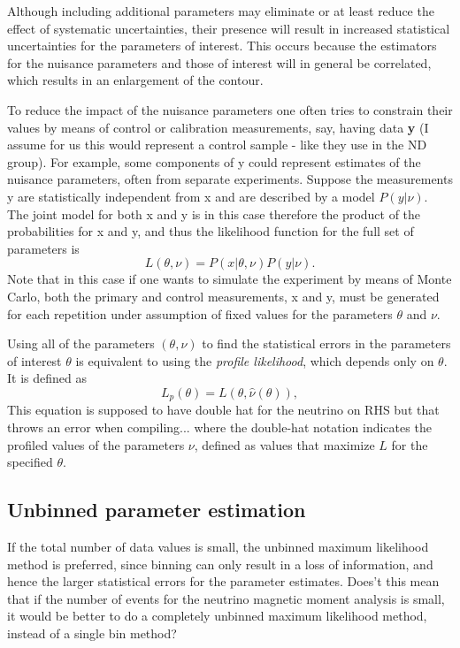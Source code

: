Although including additional parameters may eliminate or at least reduce the effect of systematic uncertainties, their presence will result in increased statistical uncertainties for the parameters of interest. This occurs because the estimators for the nuisance parameters and those of interest will in general be correlated, which results in an enlargement of the contour.

To reduce the impact of the nuisance parameters one often tries to constrain their values by means of control or calibration measurements, say, having data \textbf{y} (I assume for us this would represent a control sample - like they use in the ND group). For example, some components of y could represent estimates of the nuisance parameters, often from separate experiments. Suppose the measurements y are statistically independent from x and are described by a model $P\left(y|\nu\right)$. The joint model for both x and y is in this case therefore the product of the probabilities for x
and y, and thus the likelihood function for the full set of parameters is
\begin{equation}
L\left(\theta,\nu\right)=P\left(x|\theta,\nu\right)P\left(y|\nu\right).
\end{equation}
Note that in this case if one wants to simulate the experiment by means of Monte Carlo, both the primary and control measurements, x and y, must be generated for each repetition under assumption of fixed values for the parameters $\theta$ and $\nu$.

Using all of the parameters $\left(\theta,\nu\right)$  to find the statistical errors in the parameters of interest $\theta$ is equivalent to using the \textit{profile likelihood}, which depends only on $\theta$. It is defined as
\begin{equation}
L_p\left(\theta\right)=L\left(\theta,\hat{\nu}\left(\theta\right)\right),
\end{equation}
This equation is supposed to have double hat for the neutrino on RHS but that throws an error when compiling...
where the double-hat notation indicates the profiled values of the parameters $\nu$, defined as values that maximize $L$ for the specified $\theta$.

\subsection{Unbinned parameter estimation}
If the total number of data values is small, the unbinned maximum likelihood method is preferred, since binning can only result in a loss of information, and hence the larger statistical errors for the parameter estimates.
Does't this mean that if the number of events for the neutrino magnetic moment analysis is small, it would be better to do a completely unbinned maximum likelihood method, instead of a single bin method?

